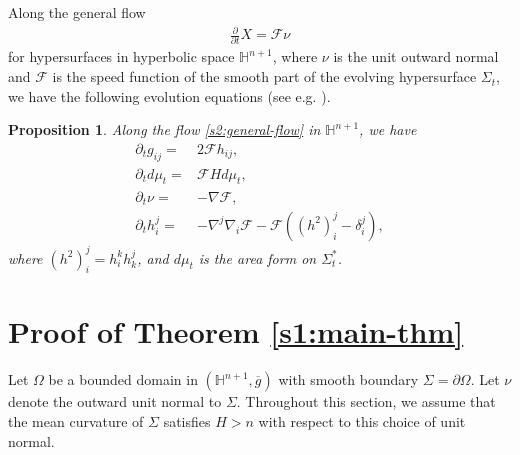 \documentclass[11pt,reqno]{amsart}
\newtheorem{prop}[thm]{Proposition}
\theoremstyle{definition}
\theoremstyle{remark}
\numberwithin{equation}{section}
\renewcommand{\(}{\left(}
\renewcommand{\)}{\right)}
\renewcommand{\~}{\widetilde}
\renewcommand{\-}{\overline}
\renewcommand{\d}{\delta}
\begin{document}
Along the general flow
\begin{align}\label{s2:general-flow}
\frac{\partial}{\partial t}X=\mathcal{F}\nu
\end{align}
for hypersurfaces in hyperbolic space $\mathbb{H}^{n+1}$, where $\nu$ is the unit outward normal and $\mathcal{F}$ is the speed function of the smooth part of the evolving hypersurface $\Sigma_t$, we have the following evolution equations (see e.g. \cite[Theorem 3.2]{HP99}).
\begin{prop}\label{s2:prop-general-evolution}
	Along the flow \eqref{s2:general-flow} in $\mathbb{H}^{n+1}$, we have
	\begin{align}
	\partial_t g_{ij}=&2\mathcal{F} h_{ij}, \label{s2:evolution-induced-metric}\\
	\partial_t d\mu_t=&\mathcal{F}H d\mu_t, \label{s2:evolution-area}\\
	\partial_t \nu =&-\nabla \mathcal{F}, \label{s2:evolution-unit-normal}\\
	\partial_t h_i^j=&-\nabla^j \nabla_i \mathcal{F}-\mathcal{F}((h^2)_i^j-\d_i^j),\label{s2:evolution-Weingarten}
	\end{align}
	where $(h^2)_i^j=h_i^k h_k^j$, and $d\mu_t$ is the area form on $\Sigma_t^\ast$.
\end{prop}

\section{Proof of Theorem \ref{s1:main-thm}}\label{sec:3}
Let $\Omega$ be a bounded domain in $(\mathbb H^{n+1},\-g)$ with smooth boundary $\Sigma=\partial \Omega$. Let $\nu$ denote the outward unit normal to $\Sigma$. Throughout this section, we assume that the mean curvature of $\Sigma$ satisfies $H>n$ with respect to this choice of unit normal.
\end{document}
